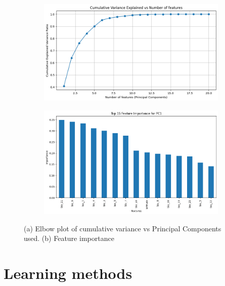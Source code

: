 \documentclass{article}
\begin{document}
\begin{figure}[H]
    \centering
    \begin{subfigure}[b]{0.48\linewidth}  %
        \centering
        \includegraphics[width=\linewidth]{Cumulative Variance Explained vs Number of features.png}
        \caption{}
    \end{subfigure}
    \begin{subfigure}[b]{0.48\linewidth}
        \centering
        \includegraphics[width=\linewidth]{Feature Importance for id = 53.png}
        \caption{}
    \end{subfigure}
    \hspace{0.1cm}
    \caption{(a) Elbow plot of cumulative variance vs Principal Components used.  (b) Feature importance}
\end{figure}

\section{Learning methods}
\end{document}
